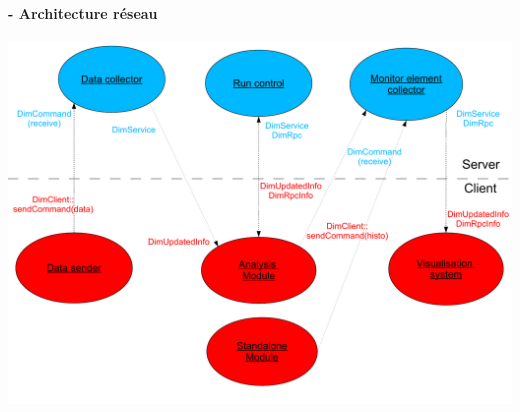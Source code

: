 \documentclass[8pt]{beamer}
\begin{document}
  \begin{frame}
  \frametitle{\secname}
  \framesubtitle{\subsecname - Architecture réseau}
    \begin{center}
      \includegraphics[width=\textwidth]{NetworkImplementation.pdf}        
    \end{center}    
  \end{frame}
  
\end{document}
